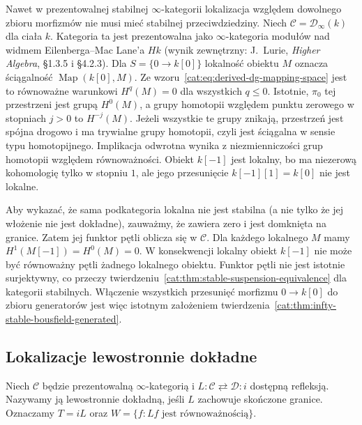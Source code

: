 \begin{przyklad}\label{cat:ex:infty-bousfield-nonstable-target}
Nawet w prezentowalnej stabilnej $\infty$-kategorii lokalizacja względem dowolnego zbioru morfizmów nie musi mieć stabilnej przeciwdziedziny. Niech $\mathcal C=\mathcal D_\infty(k)$ dla ciała $k$. Kategoria ta jest prezentowalna jako $\infty$-kategoria modułów nad widmem Eilenberga--Mac Lane'a $Hk$ (wynik zewnętrzny: J.~Lurie, \emph{Higher Algebra}, \S1.3.5 i \S4.2.3). Dla $S=\{0\to k[0]\}$ lokalność obiektu $M$ oznacza ściągalność $\operatorname{Map}(k[0],M)$. Ze wzoru~\eqref{cat:eq:derived-dg-mapping-space} jest to równoważne warunkowi $H^q(M)=0$ dla wszystkich $q\leq0$. Istotnie, $\pi_0$ tej przestrzeni jest grupą $H^0(M)$, a grupy homotopii względem punktu zerowego w stopniach $j>0$ to $H^{-j}(M)$. Jeżeli wszystkie te grupy znikają, przestrzeń jest spójna drogowo i ma trywialne grupy homotopii, czyli jest ściągalna w sensie typu homotopijnego. Implikacja odwrotna wynika z niezmienniczości grup homotopii względem równoważności. Obiekt $k[-1]$ jest lokalny, bo ma niezerową kohomologię tylko w stopniu $1$, ale jego przesunięcie $k[-1][1]=k[0]$ nie jest lokalne.

Aby wykazać, że sama podkategoria lokalna nie jest stabilna (a nie tylko że jej włożenie nie jest dokładne), zauważmy, że zawiera zero i jest domknięta na granice. Zatem jej funktor pętli oblicza się w $\mathcal C$. Dla każdego lokalnego $M$ mamy $H^1(M[-1])=H^0(M)=0$. W konsekwencji lokalny obiekt $k[-1]$ nie może być równoważny pętli żadnego lokalnego obiektu. Funktor pętli nie jest istotnie surjektywny, co przeczy twierdzeniu~\ref{cat:thm:stable-suspension-equivalence} dla kategorii stabilnych. Włączenie wszystkich przesunięć morfizmu $0\to k[0]$ do zbioru generatorów jest więc istotnym założeniem twierdzenia~\ref{cat:thm:infty-stable-bousfield-generated}.
\end{przyklad}

\subsection{Lokalizacje lewostronnie dokładne}

\begin{definicja}\label{cat:def:infty-bousfield-left-exact}
Niech $\mathcal C$ będzie prezentowalną $\infty$-kategorią i $L:\mathcal C\rightleftarrows\mathcal D:i$ dostępną refleksją. Nazywamy ją lewostronnie dokładną, jeśli $L$ zachowuje skończone granice. Oznaczamy $T=iL$ oraz $W=\{f:Lf\text{ jest równoważnością}\}$.
\end{definicja}


